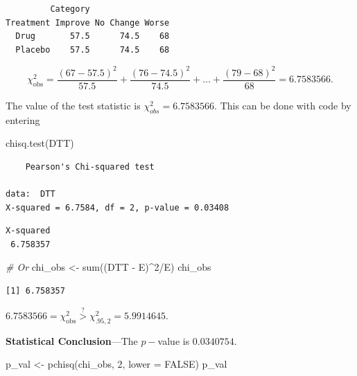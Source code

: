 \documentclass[
]{article}
\newenvironment{Shaded}{\begin{snugshade}}{\end{snugshade}}
\newcommand{\AttributeTok}[1]{\textcolor[rgb]{0.77,0.63,0.00}{#1}}
\newcommand{\CommentTok}[1]{\textcolor[rgb]{0.56,0.35,0.01}{\textit{#1}}}
\newcommand{\ConstantTok}[1]{\textcolor[rgb]{0.00,0.00,0.00}{#1}}
\newcommand{\DecValTok}[1]{\textcolor[rgb]{0.00,0.00,0.81}{#1}}
\newcommand{\FunctionTok}[1]{\textcolor[rgb]{0.00,0.00,0.00}{#1}}
\newcommand{\NormalTok}[1]{#1}
\newcommand{\OtherTok}[1]{\textcolor[rgb]{0.56,0.35,0.01}{#1}}
\newcommand{\SpecialCharTok}[1]{\textcolor[rgb]{0.00,0.00,0.00}{#1}}
\begin{document}
\begin{verbatim}
         Category
Treatment Improve No Change Worse
  Drug       57.5      74.5    68
  Placebo    57.5      74.5    68
\end{verbatim}

\[\chi^2_{\text{obs}}=\frac{(67 - 57.5)^2}{57.5} + \frac{(76 - 74.5)^2}{74.5}+
\dots +\frac{(79-68)^2}{68}=6.7583566.\]

The value of the test statistic is \(\chi^2_{obs}=6.7583566.\) This can be done with code by entering

\begin{Shaded}
\begin{Highlighting}[]
\FunctionTok{chisq.test}\NormalTok{(DTT)}
\end{Highlighting}
\end{Shaded}

\begin{verbatim}
    Pearson's Chi-squared test

data:  DTT
X-squared = 6.7584, df = 2, p-value = 0.03408
\end{verbatim}

\begin{Shaded}
\end{Shaded}

\begin{verbatim}
X-squared 
 6.758357 
\end{verbatim}

\begin{Shaded}
\begin{Highlighting}[]
\CommentTok{\# Or }
\NormalTok{chi\_obs }\OtherTok{\textless{}{-}} \FunctionTok{sum}\NormalTok{((DTT }\SpecialCharTok{{-}}\NormalTok{ E)}\SpecialCharTok{\^{}}\DecValTok{2}\SpecialCharTok{/}\NormalTok{E)}
\NormalTok{chi\_obs}
\end{Highlighting}
\end{Shaded}

\begin{verbatim}
[1] 6.758357
\end{verbatim}

\(6.7583566 = \chi^2_{\text{obs}}\overset{?}{>} \chi^2_{.95,2}= 5.9914645.\)

\textbf{Statistical Conclusion}---The \(p-\)value is \(0.0340754.\)

\begin{Shaded}
\begin{Highlighting}[]
\NormalTok{p\_val }\OtherTok{\textless{}{-}} \FunctionTok{pchisq}\NormalTok{(chi\_obs, }\DecValTok{2}\NormalTok{, }\AttributeTok{lower =} \ConstantTok{FALSE}\NormalTok{)}
\NormalTok{p\_val}
\end{Highlighting}
\end{Shaded}
\end{document}
